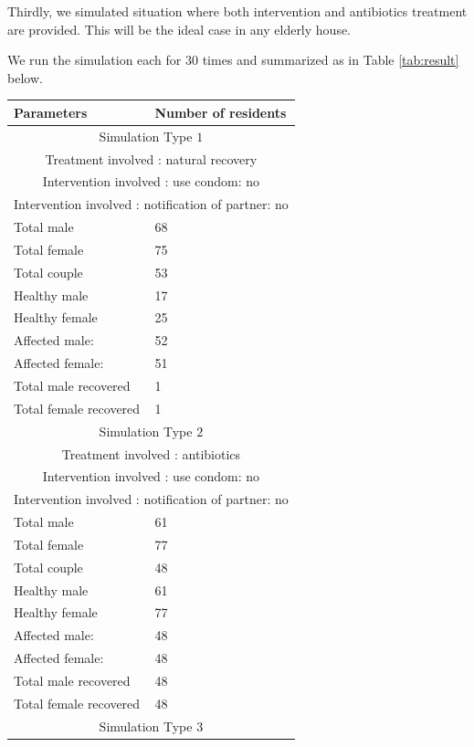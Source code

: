 \documentclass{article}
\begin{document}
\begin{normalsize}
Thirdly, we simulated situation where both intervention and antibiotics treatment are provided. This will be the ideal case in any elderly house.

We run the simulation each for $30$ times and summarized as in Table \ref{tab:result} below.

\begin{table}[H]
	\centering
	\begin{tabular}{ |p{7cm}|p{7cm}| } 
		\hline
		Parameters  & Number of residents\\ 
		\hline
		\multicolumn{2}{|c|}{Simulation Type $1$} \\
		\multicolumn{2}{|c|}{Treatment involved : natural recovery} \\
		\multicolumn{2}{|c|}{Intervention involved : use condom: no} \\
		\multicolumn{2}{|c|}{Intervention involved : notification of partner: no} \\
		\hline
		Total male & 68\\
		Total female & 75\\
		Total couple & 53\\
		Healthy male & 17\\
		Healthy female & 25\\
		Affected male: & 52\\
		Affected female: & 51\\
		Total male recovered & 1\\
		Total female recovered & 1\\
		\hline
		\multicolumn{2}{|c|}{Simulation Type $2$} \\
		\multicolumn{2}{|c|}{Treatment involved : antibiotics} \\
		\multicolumn{2}{|c|}{Intervention involved : use condom: no} \\
		\multicolumn{2}{|c|}{Intervention involved : notification of partner: no} \\
		\hline
		Total male & 61\\
		Total female & 77\\
		Total couple & 48\\
		Healthy male & 61\\
		Healthy female & 77\\
		Affected male: & 48\\
		Affected female: & 48\\
		Total male recovered & 48\\
		Total female recovered & 48\\		
		\hline
		\multicolumn{2}{|c|}{Simulation Type $3$} \\

\end{tabular}
\end{table}
\end{normalsize}
\end{document}
